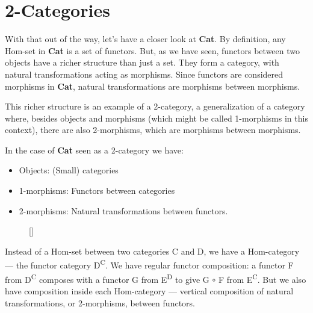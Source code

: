 \section{2-Categories}\label{categories}

With that out of the way, let's have a closer look at \textbf{Cat}. By
definition, any Hom-set in \textbf{Cat} is a set of functors. But, as we
have seen, functors between two objects have a richer structure than
just a set. They form a category, with natural transformations acting as
morphisms. Since functors are considered morphisms in \textbf{Cat},
natural transformations are morphisms between morphisms.

This richer structure is an example of a 2-category, a generalization of
a category where, besides objects and morphisms (which might be called
1-morphisms in this context), there are also 2-morphisms, which are
morphisms between morphisms.

In the case of \textbf{Cat} seen as a 2-category we have:

\begin{itemize}
\tightlist
\item
  Objects: (Small) categories
\item
  1-morphisms: Functors between categories
\item
  2-morphisms: Natural transformations between functors.
\end{itemize}

\begin{figure}
\raisebox{0pt}[\dimexpr{}\baselineskip\relax]{
}%
\end{figure}

\noindent
Instead of a Hom-set between two categories C and D, we have a
Hom-category --- the functor category D\textsuperscript{C}. We have
regular functor composition: a functor F from D\textsuperscript{C}
composes with a functor G from E\textsuperscript{D} to give G  \ensuremath{\circ} F from
E\textsuperscript{C}. But we also have composition inside each
Hom-category --- vertical composition of natural transformations, or
2-morphisms, between functors.

